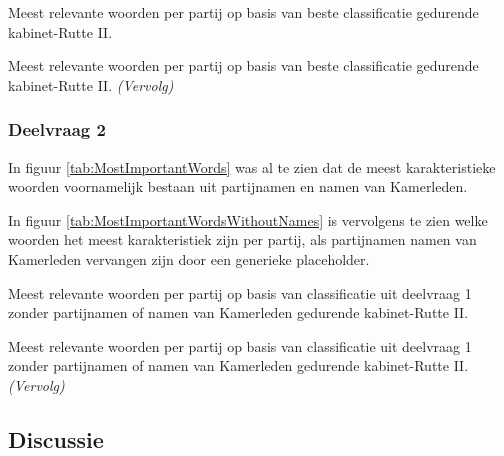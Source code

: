 \begin{table}[H]
\caption{Meest relevante woorden per partij op basis van beste classificatie gedurende kabinet-Rutte II.} 
\label{tab:MostImportantWords} 
\centering
\hspace*{-1in}
 
\end{table} 
\addtocounter{table}{-1} 
\begin{table}[H]
\caption{Meest relevante woorden per partij op basis van beste classificatie gedurende kabinet-Rutte II. \emph{(Vervolg)}} 
\centering
\hspace*{-1in}
 
\end{table}

\subsubsection{Deelvraag 2}
In figuur \ref{tab:MostImportantWords} was al te zien dat de meest karakteristieke woorden voornamelijk bestaan uit partijnamen en namen van Kamerleden. 



In figuur \ref{tab:MostImportantWordsWithoutNames} is vervolgens te zien welke woorden het meest karakteristiek zijn per partij, als partijnamen namen van Kamerleden vervangen zijn door een generieke placeholder.
\begin{table}[H] 
\caption{Meest relevante woorden per partij op basis van classificatie uit deelvraag 1 zonder partijnamen of namen van Kamerleden gedurende kabinet-Rutte II.} 
\label{tab:MostImportantWordsWithoutNames} 
\centering
\hspace*{-1in}
 
\end{table} 
\addtocounter{table}{-1} 
\begin{table}[H] 
\caption{Meest relevante woorden per partij op basis van classificatie uit deelvraag 1 zonder partijnamen of namen van Kamerleden gedurende kabinet-Rutte II. \emph{(Vervolg)}} 
\centering
\hspace*{-0.6in}
 
\end{table}

\subsection{Discussie}
